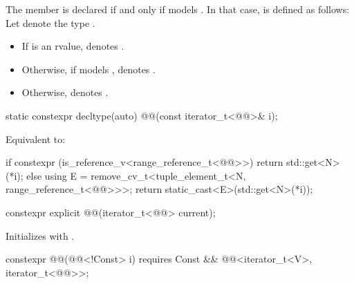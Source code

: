 \pnum
The member   is declared
if and only if  models .
In that case,  is defined as follows:
Let  denote the type
.
\begin{itemize}
\item
If  is an rvalue,
 denotes .
\item
Otherwise, if  models ,
 denotes .
\item
Otherwise,  denotes .
\end{itemize}

%
\begin{itemdecl}
static constexpr decltype(auto) @@(const iterator_t<@@>& i);
\end{itemdecl}

\begin{itemdescr}
\pnum
\effects
Equivalent to:
\begin{codeblock}
if constexpr (is_reference_v<range_reference_t<@@>>) {
  return std::get<N>(*i);
} else {
  using E = remove_cv_t<tuple_element_t<N, range_reference_t<@@>>>;
  return static_cast<E>(std::get<N>(*i));
}
\end{codeblock}
\end{itemdescr}

%
\begin{itemdecl}
constexpr explicit @@(iterator_t<@@> current);
\end{itemdecl}

\begin{itemdescr}
\pnum
\effects
Initializes  with .
\end{itemdescr}

%
\begin{itemdecl}
constexpr @@(@@<!Const> i)
  requires Const && @@<iterator_t<V>, iterator_t<@@>>;
\end{itemdecl}

